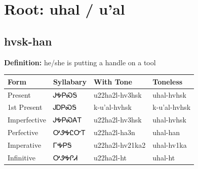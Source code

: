 \documentclass{article}%
\begin{document}
%
\normalsize%
\section*{Root: uhal / u'al}%
\subsection*{hvsk-han}%
\textbf{Definition: }%
he/she is putting a handle on a tool%
\\[0.5em]%
\begin{tabular}{|l|l|l|l|}%
\hline%
\textbf{Form}&\textbf{Syllabary}&\textbf{With Tone}&\textbf{Toneless}\\%
\hline%
Present&ᎫᎭᏢᏍᎦ&u22ha2l{-}hv3hsk&uhal{-}hvhsk\\%
1st Present&ᎫᎠᏢᏍᎦ&k{-}u'al{-}hvhsk&k{-}u'al{-}hvhsk\\%
Imperfective&ᎫᎭᏢᏍᎪᎢ&u22ha2l{-}hv3hsk&uhal{-}hvhsk\\%
Perfective&ᎤᏭᎭᏝᏅᎢ&u22ha2l{-}ha3n&uhal{-}han\\%
Imperative&ᎱᎭᏢᎦ&u22ha2l{-}hv21ka2&uhal{-}hv1ka\\%
Infinitive&ᎤᏭᎭᎵᏗ&u22ha2l{-}ht&uhal{-}ht\\%
\hline%
\end{tabular}%
\\[1em]%
\end{document}
